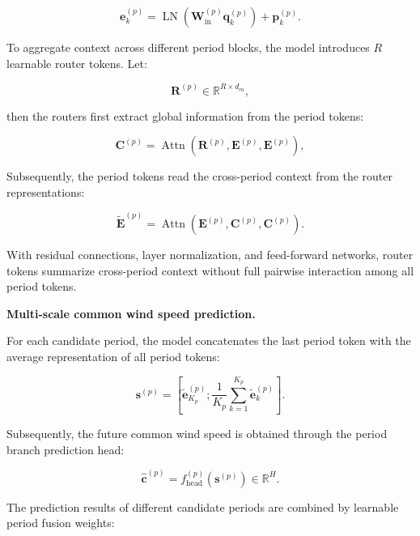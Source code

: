 \begin{equation}
\mathbf{e}^{(p)}_k = \operatorname{LN} \left( \mathbf{W}_{\mathrm{in}}^{(p)} \mathbf{q}^{(p)}_k \right) + \mathbf{p}^{(p)}_k.
\end{equation}

To aggregate context across different period blocks, the model introduces $R$ learnable router tokens. Let:

\begin{equation}
\mathbf{R}^{(p)} \in \mathbb{R}^{R\times d_m},
\end{equation}

then the routers first extract global information from the period tokens:

\begin{equation}
\mathbf{C}^{(p)} = \operatorname{Attn} \left( \mathbf{R}^{(p)}, \mathbf{E}^{(p)}, \mathbf{E}^{(p)} \right),
\end{equation}

Subsequently, the period tokens read the cross-period context from the router representations:

\begin{equation}
\widetilde{\mathbf{E}}^{(p)} = \operatorname{Attn} \left( \mathbf{E}^{(p)}, \mathbf{C}^{(p)}, \mathbf{C}^{(p)} \right).
\end{equation}

With residual connections, layer normalization, and feed-forward networks, router tokens summarize cross-period context without full pairwise interaction among all period tokens.

\textbf{Multi-scale common wind speed prediction.}

For each candidate period, the model concatenates the last period token with the average representation of all period tokens:

\begin{equation}
\mathbf{s}^{(p)} = \left[ \widetilde{\mathbf{e}}^{(p)}_{K_p}; \frac{1}{K_p} \sum_{k=1}^{K_p} \widetilde{\mathbf{e}}^{(p)}_k \right].
\end{equation}

Subsequently, the future common wind speed is obtained through the period branch prediction head:

\begin{equation}
\hat{\mathbf{c}}^{(p)} = f_{\mathrm{head}}^{(p)} \left( \mathbf{s}^{(p)} \right) \in \mathbb{R}^{H}.
\end{equation}

The prediction results of different candidate periods are combined by learnable period fusion weights:

